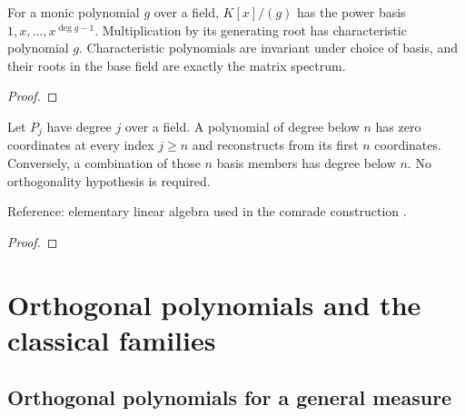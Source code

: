 \begin{supporting}

\begin{theorem}
\label{thm:mathlib-quotient-charpoly}
\mathlibok
For a monic polynomial $g$ over a field, $K[x]/(g)$ has the power basis
$1,x,\ldots,x^{\deg g-1}$. Multiplication by its generating root has
characteristic polynomial $g$. Characteristic polynomials are invariant under
choice of basis, and their roots in the base field are exactly the matrix spectrum.
\end{theorem}
\begin{proof}
\mathlibok
\end{proof}

\begin{theorem}
\label{thm:sequence-finite-coordinates}
\leanok
Let $P_j$ have degree $j$ over a field. A polynomial of degree below $n$ has
zero coordinates at every index $j\ge n$ and reconstructs from its first $n$
coordinates. Conversely, a combination of those $n$ basis members has degree
below $n$. No orthogonality hypothesis is required.

Reference: elementary linear algebra used in the comrade construction \cite{barnett-comrade}.
\end{theorem}
\begin{proof}
\leanok
\end{proof}

\end{supporting}

\part{Orthogonal polynomials and the classical families}\label{part:op}

\chapter{Orthogonal polynomials for a general measure}\label{chap:general}

